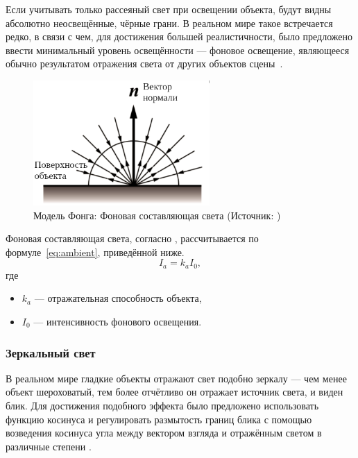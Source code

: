 Если учитывать только рассеяный свет при освещении объекта, будут видны абсолютно неосвещённые, чёрные грани.
В реальном мире такое встречается редко, в связи с чем, для достижения большей реалистичности, было предложено ввести минимальный уровень освещённости --- фоновое освещение, являющееся обычно результатом отражения света от других объектов сцены~\cite{phong, quakecon}.

\begin{figure}[H]
	\centering
	\includegraphics[width=0.6\textwidth]{img/ambient_ru}
    \caption{Модель Фонга: Фоновая составляющая света (Источник: \cite{phong})}
	\label{fig:ambient}
\end{figure}

Фоновая составляющая света, согласно \cite{phong}, рассчитывается по формуле~\ref{eq:ambient}, приведённой ниже.
\begin{equation}
    I_a = k_a I_0,
    \label{eq:ambient}
\end{equation}
где
\begin{itemize}
    \item $k_a$ --- отражательная способность объекта,
    \item $I_0$ --- интенсивность фонового освещения.
\end{itemize}

\subsubsection*{Зеркальный свет}

В реальном мире гладкие объекты отражают свет подобно зеркалу --- чем менее объект шероховатый, тем более отчётливо он отражает источник света, и виден блик.
Для достижения подобного эффекта было предложено использовать функцию косинуса и регулировать размытость границ блика с помощью возведения косинуса угла между вектором взгляда и отражённым светом в различные степени \cite{quakecon}.

